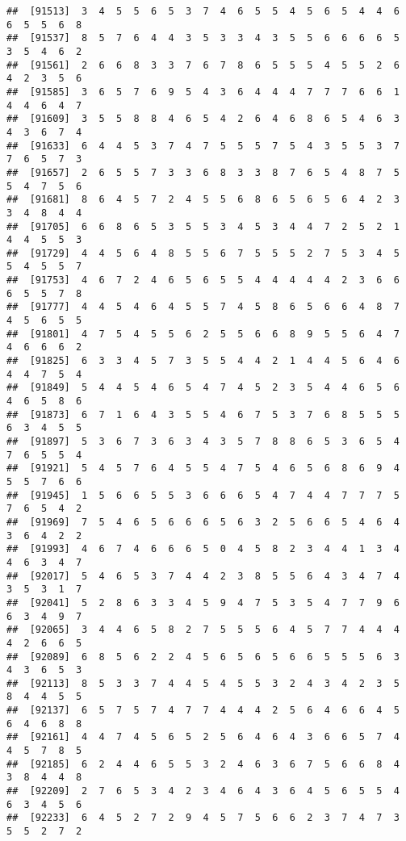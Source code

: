\documentclass[
]{book}
\begin{document}
\begin{verbatim}
##  [91513]  3  4  5  5  6  5  3  7  4  6  5  5  4  5  6  5  4  4  6  6  5  5  6  8
##  [91537]  8  5  7  6  4  4  3  5  3  3  4  3  5  5  6  6  6  6  5  3  5  4  6  2
##  [91561]  2  6  6  8  3  3  7  6  7  8  6  5  5  5  4  5  5  2  6  4  2  3  5  6
##  [91585]  3  6  5  7  6  9  5  4  3  6  4  4  4  7  7  7  6  6  1  4  4  6  4  7
##  [91609]  3  5  5  8  8  4  6  5  4  2  6  4  6  8  6  5  4  6  3  4  3  6  7  4
##  [91633]  6  4  4  5  3  7  4  7  5  5  5  7  5  4  3  5  5  3  7  7  6  5  7  3
##  [91657]  2  6  5  5  7  3  3  6  8  3  3  8  7  6  5  4  8  7  5  5  4  7  5  6
##  [91681]  8  6  4  5  7  2  4  5  5  6  8  6  5  6  5  6  4  2  3  3  4  8  4  4
##  [91705]  6  6  8  6  5  3  5  5  3  4  5  3  4  4  7  2  5  2  1  4  4  5  5  3
##  [91729]  4  4  5  6  4  8  5  5  6  7  5  5  5  2  7  5  3  4  5  5  4  5  5  7
##  [91753]  4  6  7  2  4  6  5  6  5  5  4  4  4  4  4  2  3  6  6  6  5  5  7  8
##  [91777]  4  4  5  4  6  4  5  5  7  4  5  8  6  5  6  6  4  8  7  4  5  6  5  5
##  [91801]  4  7  5  4  5  5  6  2  5  5  6  6  8  9  5  5  6  4  7  4  6  6  6  2
##  [91825]  6  3  3  4  5  7  3  5  5  4  4  2  1  4  4  5  6  4  6  4  4  7  5  4
##  [91849]  5  4  4  5  4  6  5  4  7  4  5  2  3  5  4  4  6  5  6  4  6  5  8  6
##  [91873]  6  7  1  6  4  3  5  5  4  6  7  5  3  7  6  8  5  5  5  6  3  4  5  5
##  [91897]  5  3  6  7  3  6  3  4  3  5  7  8  8  6  5  3  6  5  4  7  6  5  5  4
##  [91921]  5  4  5  7  6  4  5  5  4  7  5  4  6  5  6  8  6  9  4  5  5  7  6  6
##  [91945]  1  5  6  6  5  5  3  6  6  6  5  4  7  4  4  7  7  7  5  7  6  5  4  2
##  [91969]  7  5  4  6  5  6  6  6  5  6  3  2  5  6  6  5  4  6  4  3  6  4  2  2
##  [91993]  4  6  7  4  6  6  6  5  0  4  5  8  2  3  4  4  1  3  4  4  6  3  4  7
##  [92017]  5  4  6  5  3  7  4  4  2  3  8  5  5  6  4  3  4  7  4  3  5  3  1  7
##  [92041]  5  2  8  6  3  3  4  5  9  4  7  5  3  5  4  7  7  9  6  6  3  4  9  7
##  [92065]  3  4  4  6  5  8  2  7  5  5  5  6  4  5  7  7  4  4  4  4  2  6  6  5
##  [92089]  6  8  5  6  2  2  4  5  6  5  6  5  6  6  5  5  5  6  3  4  3  6  5  3
##  [92113]  8  5  3  3  7  4  4  5  4  5  5  3  2  4  3  4  2  3  5  8  4  4  5  5
##  [92137]  6  5  7  5  7  4  7  7  4  4  4  2  5  6  4  6  6  4  5  6  4  6  8  8
##  [92161]  4  4  7  4  5  6  5  2  5  6  4  6  4  3  6  6  5  7  4  4  5  7  8  5
##  [92185]  6  2  4  4  6  5  5  3  2  4  6  3  6  7  5  6  6  8  4  3  8  4  4  8
##  [92209]  2  7  6  5  3  4  2  3  4  6  4  3  6  4  5  6  5  5  4  6  3  4  5  6
##  [92233]  6  4  5  2  7  2  9  4  5  7  5  6  6  2  3  7  4  7  3  5  5  2  7  2

\end{verbatim}
\end{document}
